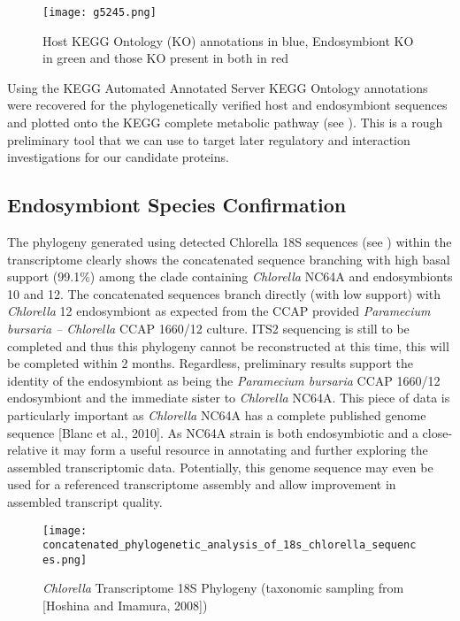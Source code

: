 \documentclass[a4paper,11pt]{article}
\begin{document}
\begin{figure}
  \begin{center}
    \texttt{[image: g5245.png]}
    \caption{ Host KEGG Ontology (KO) annotations in blue, Endosymbiont KO in green and those KO present in both in red}
        \label{fig:metabolic_mapping}
  \end{center}
\end{figure}

Using the KEGG Automated Annotated Server KEGG Ontology annotations were recovered for the phylogenetically verified host and endosymbiont sequences and plotted onto the KEGG complete metabolic pathway (see ).  This is a rough preliminary tool that we can use to target later regulatory and interaction investigations for our candidate proteins.

\subsection{Endosymbiont Species Confirmation}

The phylogeny generated using detected Chlorella 18S sequences (see ) within the transcriptome clearly shows the concatenated sequence branching with high basal support (99.1\%) among the clade containing \textit{Chlorella} NC64A and endosymbionts 10 and 12. 
The concatenated sequences branch directly (with low support) with \textit{Chlorella} 12 endosymbiont as expected from the CCAP provided \textit{Paramecium bursaria – Chlorella} CCAP 1660/12 culture.  
ITS2 sequencing is still to be completed and thus this phylogeny cannot be reconstructed at this time, this will be completed within 2 months.
Regardless, preliminary results support the identity of the endosymbiont as being the \textit{Paramecium bursaria} CCAP 1660/12 endosymbiont and the immediate sister to \textit{Chlorella} NC64A.  This piece of data is particularly important as \textit{Chlorella} NC64A has a complete published genome sequence [Blanc et al., 2010]. As NC64A strain is both endosymbiotic and a close-relative it may form a useful resource in annotating and further exploring the assembled transcriptomic data.  
Potentially, this genome sequence may even be used for a referenced transcriptome assembly and allow improvement in assembled transcript quality.

\newpage

\begin{figure}
  \begin{center}
    \texttt{[image: concatenated\_phylogenetic\_analysis\_of\_18s\_chlorella\_sequences.png]}

    \caption{\textit{Chlorella} Transcriptome 18S Phylogeny (taxonomic sampling from [Hoshina and Imamura, 2008])}
        \label{fig:phylogeny}
  \end{center}
\end{figure}
\end{document}
